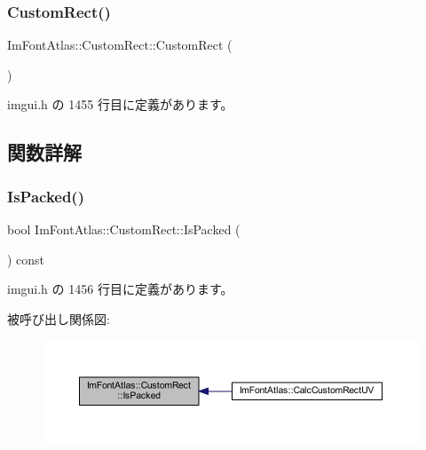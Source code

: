 \subsubsection{\texorpdfstring{Custom\+Rect()}{CustomRect()}}
{\footnotesize\ttfamily Im\+Font\+Atlas\+::\+Custom\+Rect\+::\+Custom\+Rect (\begin{DoxyParamCaption}{ }\end{DoxyParamCaption})\hspace{0.3cm}{\ttfamily [inline]}}



 imgui.\+h の 1455 行目に定義があります。



\subsection{関数詳解}
\mbox{\label{struct_im_font_atlas_1_1_custom_rect_ac15602342c8eabbddf559bc84a3e6700}} 
\subsubsection{\texorpdfstring{Is\+Packed()}{IsPacked()}}
{\footnotesize\ttfamily bool Im\+Font\+Atlas\+::\+Custom\+Rect\+::\+Is\+Packed (\begin{DoxyParamCaption}{ }\end{DoxyParamCaption}) const\hspace{0.3cm}{\ttfamily [inline]}}



 imgui.\+h の 1456 行目に定義があります。

被呼び出し関係図\+:\nopagebreak
\begin{figure}[H]
\begin{center}
\leavevmode
\includegraphics[width=350pt]{struct_im_font_atlas_1_1_custom_rect_ac15602342c8eabbddf559bc84a3e6700_icgraph}
\end{center}
\end{figure}


